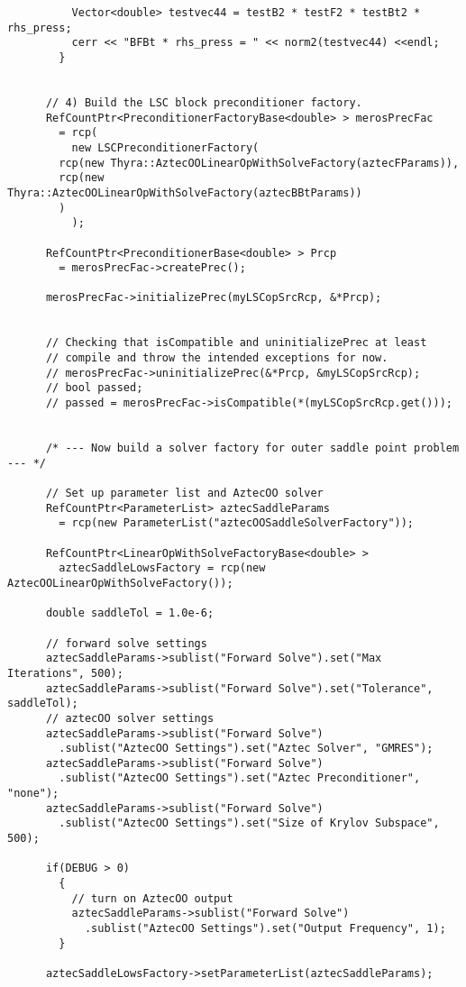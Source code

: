 \begin{verbatim}
          Vector<double> testvec44 = testB2 * testF2 * testBt2 * rhs_press;
          cerr << "BFBt * rhs_press = " << norm2(testvec44) <<endl;
        }


      // 4) Build the LSC block preconditioner factory.
      RefCountPtr<PreconditionerFactoryBase<double> > merosPrecFac
        = rcp(
	      new LSCPreconditionerFactory(
		rcp(new Thyra::AztecOOLinearOpWithSolveFactory(aztecFParams)),
		rcp(new Thyra::AztecOOLinearOpWithSolveFactory(aztecBBtParams))
		)
	      );
      
      RefCountPtr<PreconditionerBase<double> > Prcp 
        = merosPrecFac->createPrec();
      
      merosPrecFac->initializePrec(myLSCopSrcRcp, &*Prcp);


      // Checking that isCompatible and uninitializePrec at least
      // compile and throw the intended exceptions for now.
      // merosPrecFac->uninitializePrec(&*Prcp, &myLSCopSrcRcp);
      // bool passed;
      // passed = merosPrecFac->isCompatible(*(myLSCopSrcRcp.get()));


      /* --- Now build a solver factory for outer saddle point problem --- */

      // Set up parameter list and AztecOO solver
      RefCountPtr<ParameterList> aztecSaddleParams 
        = rcp(new ParameterList("aztecOOSaddleSolverFactory"));
      
      RefCountPtr<LinearOpWithSolveFactoryBase<double> >
        aztecSaddleLowsFactory = rcp(new AztecOOLinearOpWithSolveFactory());
      
      double saddleTol = 1.0e-6;

      // forward solve settings
      aztecSaddleParams->sublist("Forward Solve").set("Max Iterations", 500);
      aztecSaddleParams->sublist("Forward Solve").set("Tolerance", saddleTol);
      // aztecOO solver settings
      aztecSaddleParams->sublist("Forward Solve")
        .sublist("AztecOO Settings").set("Aztec Solver", "GMRES");
      aztecSaddleParams->sublist("Forward Solve")
        .sublist("AztecOO Settings").set("Aztec Preconditioner", "none");
      aztecSaddleParams->sublist("Forward Solve")
        .sublist("AztecOO Settings").set("Size of Krylov Subspace", 500);

      if(DEBUG > 0)
        {
          // turn on AztecOO output
          aztecSaddleParams->sublist("Forward Solve")
            .sublist("AztecOO Settings").set("Output Frequency", 1);
        }

      aztecSaddleLowsFactory->setParameterList(aztecSaddleParams);


\end{verbatim}
